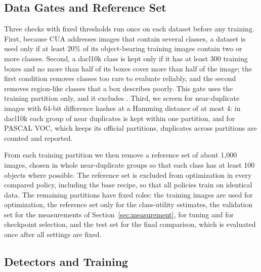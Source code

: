 \subsection{Data Gates and Reference Set}
\label{sec:setup_gates}

Three checks with fixed thresholds run once on each dataset before any training. First, because CUA addresses images that contain several classes, a dataset is used only if at least 20\% of its object-bearing training images contain two or more classes. Second, a dacl10k class is kept only if it has at least 300 training boxes and no more than half of its boxes cover more than half of the image; the first condition removes classes too rare to evaluate reliably, and the second removes region-like classes that a box describes poorly. This gate uses the training partition only, and it excludes . Third, we screen for near-duplicate images with 64-bit difference hashes at a Hamming distance of at most 4: in dacl10k each group of near duplicates is kept within one partition, and for PASCAL VOC, which keeps its official partitions, duplicates across partitions are counted and reported.

From each training partition we then remove a reference set of about 1,000 images, chosen in whole near-duplicate groups so that each class has at least 100 objects where possible. The reference set is excluded from optimization in every compared policy, including the base recipe, so that all policies train on identical data. The remaining partitions have fixed roles: the training images are used for optimization, the reference set only for the class-utility estimates, the validation set for the measurements of Section~\ref{sec:measurement}, for tuning and for checkpoint selection, and the test set for the final comparison, which is evaluated once after all settings are fixed.

\subsection{Detectors and Training}
\label{sec:setup_training}

